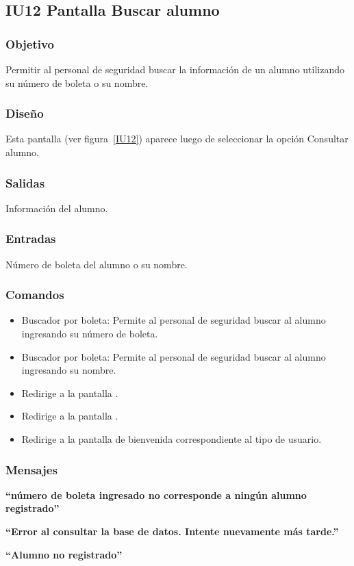 \subsection{IU12 Pantalla Buscar alumno}

\subsubsection{Objetivo}
    Permitir al personal de seguridad buscar la información de un alumno utilizando su número de boleta o su nombre. 

\subsubsection{Diseño}
    Esta pantalla  (ver figura~\ref{IU12}) aparece luego de seleccionar la opción Consultar alumno. 


\subsubsection{Salidas}
    Información del alumno.

\subsubsection{Entradas}
    Número de boleta del alumno o su nombre. 

\subsubsection{Comandos}
\begin{itemize}
    \item Buscador por boleta: Permite al personal de seguridad buscar al alumno ingresando su número de boleta.
    \item Buscador por boleta: Permite al personal de seguridad buscar al alumno ingresando su nombre.
    \item {} Redirige a la pantalla .
    \item {} Redirige a la pantalla .
    \item {} Redirige a la pantalla de bienvenida correspondiente al tipo de usuario.
\end{itemize}

\subsubsection{Mensajes}

\begin{Citemize}
    \item {\bf ``número de boleta ingresado no corresponde a ningún alumno registrado''}
    \item {\bf ``Error al consultar la base de datos. Intente nuevamente más tarde.''}
    \item {\bf ``Alumno no registrado''}
\end{Citemize}


